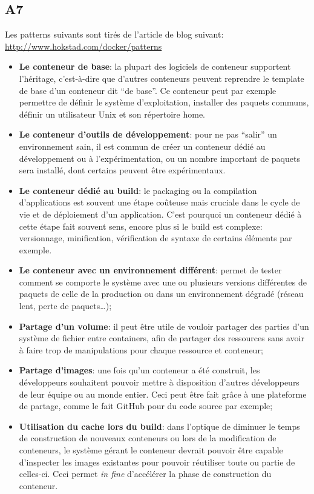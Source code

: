 \subsection*{A7}
    Les patterns suivants sont tirés de l'article de blog suivant: \url{http://www.hokstad.com/docker/patterns}
    \begin{itemize}
        \item \textbf{Le conteneur de base}: la plupart des logiciels de conteneur supportent l'héritage, c'est-à-dire que d'autres conteneurs peuvent reprendre le template de base d'un conteneur dit \enquote{de base}. Ce conteneur peut par exemple permettre de définir le système d'exploitation, installer des paquets communs, définir un utilisateur Unix et son répertoire home.
        \item \textbf{Le conteneur d'outils de développement}: pour ne pas \enquote{salir} un environnement sain, il est commun de créer un conteneur dédié au développement ou à l'expérimentation, ou un nombre important de paquets sera installé, dont certains peuvent être expérimentaux.
        \item \textbf{Le conteneur dédié au build}: le packaging ou la compilation d'applications est souvent une étape coûteuse mais cruciale dans le cycle de vie et de déploiement d'un application. C'est pourquoi un conteneur dédié à cette étape fait souvent sens, encore plus si le build est complexe: versionnage, minification, vérification de syntaxe de certains éléments par exemple.
        \item \textbf{Le conteneur avec un environnement différent}: permet de tester comment se comporte le système avec une ou plusieurs versions différentes de paquets de celle de la production ou dans un environnement dégradé (réseau lent, perte de paquets\dots);
        \item \textbf{Partage d'un volume}: il peut être utile de vouloir partager des parties d'un système de fichier entre containers, afin de partager des ressources sans avoir à faire trop de manipulations pour chaque ressource et conteneur;
        \item \textbf{Partage d'images}: une fois qu'un conteneur a été construit, les développeurs souhaitent pouvoir mettre à disposition d'autres développeurs de leur équipe ou au monde entier. Ceci peut être fait grâce à une plateforme de partage, comme le fait GitHub pour du code source par exemple;
        \item \textbf{Utilisation du cache lors du build}: dans l'optique de diminuer le temps de construction de nouveaux conteneurs ou lors de la modification de conteneurs, le système gérant le conteneur devrait pouvoir être capable d'inspecter les images existantes pour pouvoir réutiliser toute ou partie de celles-ci. Ceci permet \textit{in fine} d'accélérer la phase de construction du conteneur.
    \end{itemize}
